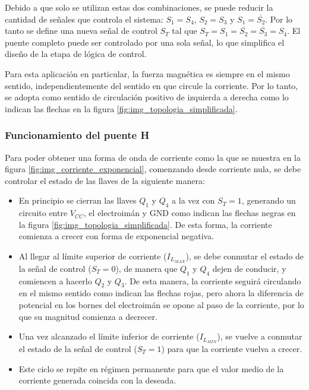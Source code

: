 Debido a que solo se utilizan estas dos combinaciones, se puede reducir la cantidad de señales que controla el sistema: $S_1=S_4$, $S_2=S_3$ y $S_1=\overline{S_2}$. Por lo tanto se define una nueva señal de control $S_T$ tal que $S_T=S_1=\overline{S_2}=\overline{S_3}=S_4$. El puente completo puede ser controlado por una sola señal, lo que simplifica el diseño de la etapa de lógica de control.

Para esta aplicación en particular, la fuerza magnética es siempre en el mismo sentido, independientemente del sentido en que circule la corriente. Por lo tanto, se adopta como sentido de circulación positivo de izquierda a derecha como lo indican las flechas en la figura \ref{fig:img_topologia_simplificada}. 



\subsubsection{Funcionamiento del puente H}

Para poder obtener una forma de onda de corriente como la que se muestra en la figura \ref{fig:img_corriente_exponencial}, comenzando desde corriente nula, se debe controlar el estado de las llaves de la siguiente manera:


\begin{itemize}
	\item En principio se cierran las llaves $Q_1$ y $Q_4$ a la vez con $S_T=1$, generando un circuito entre $V_{CC}$, el electroimán y GND como indican las flechas negras en la figura \ref{fig:img_topologia_simplificada}. De esta forma, la corriente comienza a crecer con forma de exponencial negativa.
	\item Al llegar al límite superior de corriente ($I_{L_{MAX}}$), se debe conmutar el estado de la señal de control ($S_T=0$), de manera que $Q_1$ y $Q_4$ dejen de conducir, y comiencen a hacerlo $Q_2$ y $Q_3$. De esta manera, la corriente seguirá circulando en el mismo sentido como indican las flechas rojas, pero ahora la diferencia de potencial en los bornes del electroimán se opone al paso de la corriente, por lo que su magnitud comienza a decrecer.
	\item Una vez alcanzado el límite inferior de corriente ($I_{L_{MIN}}$), se vuelve a conmutar el estado de la señal de control ($S_T=1$) para que la corriente vuelva a crecer.
	\item Este ciclo se repite en régimen permanente para que el valor medio de la corriente generada coincida con la deseada. 
\end{itemize}

